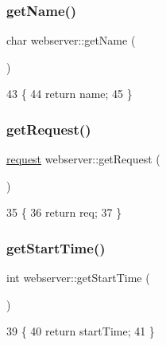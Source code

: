 \subsubsection{\texorpdfstring{get\+Name()}{getName()}}
{\footnotesize\ttfamily char webserver\+::get\+Name (\begin{DoxyParamCaption}{ }\end{DoxyParamCaption})\hspace{0.3cm}{\ttfamily [inline]}}


\begin{DoxyCode}
43                        \{
44             \textcolor{keywordflow}{return} name;
45         \}
\end{DoxyCode}
\mbox{\label{classwebserver_a8e97c299c64c0f9f46052a88888c7fc9}} 
\subsubsection{\texorpdfstring{get\+Request()}{getRequest()}}
{\footnotesize\ttfamily \hyperlink{structrequest}{request} webserver\+::get\+Request (\begin{DoxyParamCaption}{ }\end{DoxyParamCaption})\hspace{0.3cm}{\ttfamily [inline]}}


\begin{DoxyCode}
35                              \{
36             \textcolor{keywordflow}{return} req;
37         \}
\end{DoxyCode}
\mbox{\label{classwebserver_abaf7c05ca6d47a7800cfbcde62fa1744}} 
\subsubsection{\texorpdfstring{get\+Start\+Time()}{getStartTime()}}
{\footnotesize\ttfamily int webserver\+::get\+Start\+Time (\begin{DoxyParamCaption}{ }\end{DoxyParamCaption})\hspace{0.3cm}{\ttfamily [inline]}}


\begin{DoxyCode}
39                            \{
40             \textcolor{keywordflow}{return} startTime;
41         \}
\end{DoxyCode}
\mbox{\label{classwebserver_a766a603b21e0b4872fe28c3e747d104b}} 
